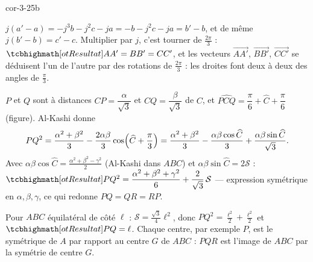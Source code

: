 \begin{blocLivre}{cor-3-25b}
\begin{corrigeSuite}
\begin{questions}[start=6]
  \item $j(a'-a)=-j^{3}b-j^{2}c-ja=-b-j^{2}c-ja=b'-b$, et de même
    $j(b'-b)=c'-c$. Multiplier par $j$, c'est tourner de
    $\frac{2\pi}{3}$ : $\res{AA'=BB'=CC'}$, et les vecteurs
    $\overrightarrow{AA'}$, $\overrightarrow{BB'}$, $\overrightarrow{CC'}$
    se déduisent l'un de l'autre par des rotations de $\frac{2\pi}{3}$ :
    les droites font deux à deux des angles de $\frac{\pi}{3}$.
  \item $P$ et $Q$ sont à distances $CP=\dfrac{\alpha}{\sqrt3}$ et
    $CQ=\dfrac{\beta}{\sqrt3}$ de $C$, et
    $\widehat{PCQ}=\dfrac{\pi}{6}+\widehat{C}+\dfrac{\pi}{6}$ (figure).
    Al-Kashi donne
    \[
    PQ^{2}=\frac{\alpha^{2}+\beta^{2}}{3}
    -\frac{2\alpha\beta}{3}\cos\Bigl(\widehat{C}+\frac{\pi}{3}\Bigr)
    =\frac{\alpha^{2}+\beta^{2}}{3}-\frac{\alpha\beta\cos\widehat{C}}{3}
    +\frac{\alpha\beta\sin\widehat{C}}{\sqrt3} .
    \]
    Avec $\alpha\beta\cos\widehat{C}=\frac{\alpha^{2}+\beta^{2}-\gamma^{2}}{2}$
    (Al-Kashi dans $ABC$) et $\alpha\beta\sin\widehat{C}=2\mathcal{S}$ :
    $\res{PQ^{2}=\dfrac{\alpha^{2}+\beta^{2}+\gamma^{2}}{6}
    +\dfrac{2}{\sqrt3}\,\mathcal{S}}$ — expression symétrique en
    $\alpha,\beta,\gamma$, ce qui redonne $PQ=QR=RP$.
  \item Pour $ABC$ équilatéral de côté $\ell$ :
    $\mathcal{S}=\frac{\sqrt3}{4}\ell^{2}$, donc
    $PQ^{2}=\frac{\ell^{2}}{2}+\frac{\ell^{2}}{2}$ et $\res{PQ=\ell}$.
    Chaque centre, par exemple $P$, est le symétrique de $A$ par rapport
    au centre $G$ de $ABC$ : $PQR$ est l'image de $ABC$ par la symétrie
    de centre $G$.
\end{questions}
\begin{center}
\end{center}
\end{corrigeSuite}
\end{blocLivre}
